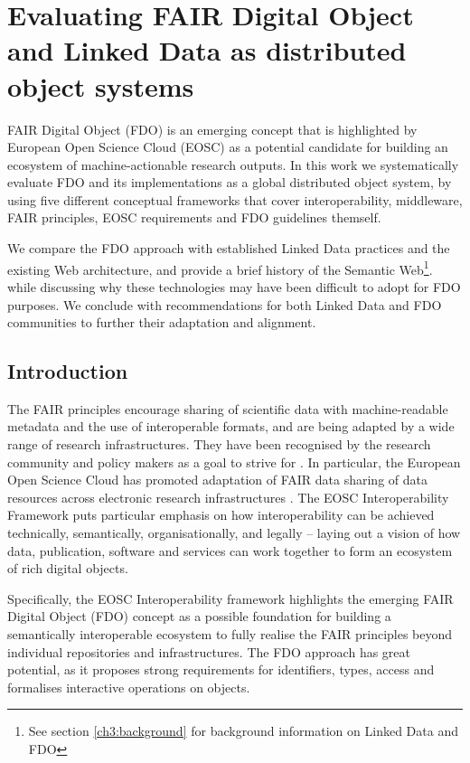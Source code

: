 \section{Evaluating FAIR Digital Object and Linked Data as distributed object systems}\label{ch3:evaluating-fdo-ld}

FAIR Digital Object (FDO) is an emerging concept that is highlighted by European Open Science Cloud (EOSC) as a potential candidate for building an ecosystem of machine-actionable research outputs. In this work we systematically evaluate FDO and its implementations as a global distributed object system, by using five different conceptual frameworks that cover interoperability, middleware, FAIR principles, EOSC requirements and FDO guidelines themself.

We compare the FDO approach with established Linked Data practices and the existing Web architecture, and provide a brief history of the Semantic Web\footnote{
  See section \vref{ch3:background} for background information on Linked Data and FDO}. while discussing why these technologies may have been difficult to adopt for FDO purposes. We conclude with recommendations for both Linked Data and FDO communities to further their adaptation and alignment.

\subsection{Introduction}\label{ch3:introduction}

The FAIR principles \cite{Wilkinson 2016} encourage sharing of scientific data with machine-readable metadata and the use of interoperable formats, and are being adapted by a wide range of research infrastructures. They have been recognised by the research community and policy makers as a goal to strive for \cite{h2020fair2016}. In particular, the European Open Science Cloud  has promoted adaptation of FAIR data sharing of data resources across electronic research infrastructures \cite{Mons 2017}. The EOSC Interoperability Framework \cite{eosc-interop-framework} puts particular emphasis on how interoperability can be achieved technically, semantically, organisationally, and legally -- laying out a vision of how data, publication, software and services can work together to form an ecosystem of rich digital objects.

Specifically, the EOSC Interoperability framework highlights the emerging FAIR Digital Object (FDO) concept \cite{schultesFAIRPrinciplesDigital2019a} as a possible foundation for building a semantically interoperable ecosystem to fully realise the FAIR principles beyond individual repositories and infrastructures. The FDO approach has great potential, as it proposes strong requirements for identifiers, types, access and formalises interactive operations on objects.

